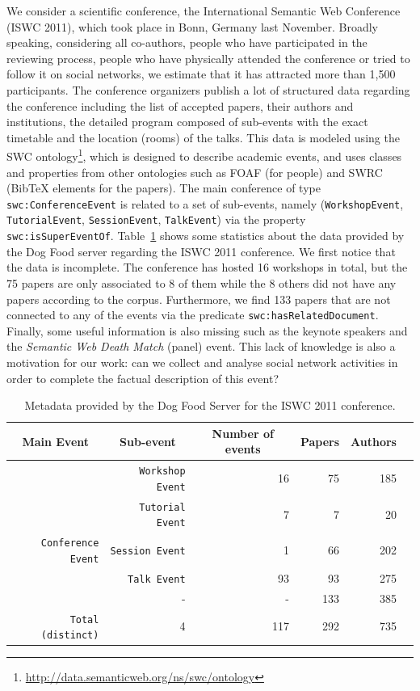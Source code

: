  We consider a scientific conference, the International Semantic Web Conference (ISWC 2011), which took place in Bonn, Germany last November. Broadly speaking, considering all co-authors, people who have participated in the reviewing process, people who have physically attended the conference or tried to follow it on social networks, we estimate that it has attracted more than 1,500 participants. The conference organizers publish a lot of structured data regarding the conference including the list of accepted papers, their authors and institutions, the detailed program composed of sub-events with the exact timetable and the location (rooms) of the talks. This data is modeled using the SWC ontology\footnote{\url{http://data.semanticweb.org/ns/swc/ontology}}, which is designed to describe academic events, and uses classes and properties from other ontologies such as FOAF (for people) and SWRC (BibTeX elements for the papers). The main conference of type \texttt{swc:ConferenceEvent} is related to a set of sub-events, namely (\texttt{WorkshopEvent}, \texttt{TutorialEvent}, \texttt{SessionEvent}, \texttt{TalkEvent}) via the property \texttt{swc:isSuperEventOf}. Table~\ref{tab:dataset-stats} shows some statistics about the data provided by the Dog Food server regarding the ISWC 2011 conference. We first notice that the data is incomplete. The conference has hosted 16 workshops in total, but the 75 papers are only associated to 8 of them while the 8 others did not have any papers according to the corpus. Furthermore, we find 133 papers that are not connected to any of the events via the predicate \texttt{swc:hasRelatedDocument}. Finally, some useful information is also missing such as the keynote speakers and the \emph{Semantic Web Death Match} (panel) event. This lack of knowledge is also a motivation for our work: can we collect and analyse social network activities in order to complete the factual description of this event?

\begin{table}[htbp]
\footnotesize{
\begin{center}
\begin{tabular}{|r|r|r|r|r|r|}
\hline
\multicolumn{1}{|c}{\textbf{Main Event}} & \multicolumn{1}{|c}{\textbf{Sub-event}} & \multicolumn{1}{|c}{\textbf{Number of events}} & \multicolumn{1}{|c}{\textbf{Papers}} & \multicolumn{1}{|c|}{\textbf{Authors}}\\
\hline
& \texttt{Workshop Event} & 16 & 75 & 185\\
& \texttt{Tutorial Event} & 7 & 7 & 20\\
\texttt{Conference Event} & \texttt{Session Event} & 1 & 66 & 202\\
& \texttt{Talk Event} & 93 & 93 & 275\\
& - & - & 133 & 385\\
\hline
\texttt{Total (distinct)} & 4 & 117  & 292 & 735 \\
\hline
\end{tabular}
\vspace{1mm}
\caption{Metadata provided by the Dog Food Server for the ISWC 2011 conference.}
\label{tab:dataset-stats}
\end{center}}
\end{table}


